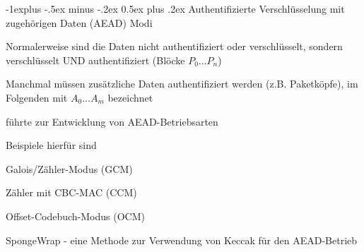 \documentclass[a4paper]{article}
\makeatletter
\renewcommand{\subsection}{\@startsection{subsection}{2}{0mm}%
 {-1explus -.5ex minus -.2ex}%
 {0.5ex plus .2ex}%
 {\normalfont\normalsize\bfseries}}
\makeatother
\begin{document}
\begin{multicols}{3}
      \subsection{Authentifizierte Verschlüsselung mit zugehörigen Daten (AEAD) Modi}
      \begin{itemize*}
            \item Normalerweise sind die Daten nicht authentifiziert oder verschlüsselt, sondern verschlüsselt UND authentifiziert (Blöcke $P_0...P_n$)
            \item Manchmal müssen zusätzliche Daten authentifiziert werden (z.B. Paketköpfe), im Folgenden mit $A_0...A_m$ bezeichnet
            \item führte zur Entwicklung von AEAD-Betriebsarten
            \item Beispiele hierfür sind
            \begin{itemize*}
                  \item Galois/Zähler-Modus (GCM)
                  \item Zähler mit CBC-MAC (CCM)
                  \item Offset-Codebuch-Modus (OCM)
                  \item SpongeWrap - eine Methode zur Verwendung von Keccak für den AEAD-Betrieb
            \end{itemize*}
      \end{itemize*}


\end{multicols}
\end{document}
